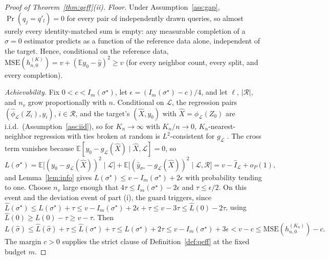 \documentclass{article}
\theoremstyle{definition}
\theoremstyle{plain}
\begin{document}
\begin{proof}[Proof of Theorem~\ref{thm:qeff}(ii)]
\emph{Floor.} Under Assumption~\ref{ass:gap}, $\Pr(q_j=q'_l)=0$ for every pair of
independently drawn queries, so almost surely every identity-matched sum is
empty: any measurable completion of a $\sigma=0$ estimator predicts as a function
of the reference data alone, independent of the target. Hence, conditional on the
reference data,
$\mathrm{MSE}(h_{n,0}^{(K)})=v+(\mathbb{E}y_{0}-\hat y)^2\ge v$
(for every neighbor count, every split, and every completion).

\emph{Achievability.} Fix $0<c<I_m(\sigma^\star)$, let
$\epsilon=(I_m(\sigma^\star)-c)/4$, and let $\ell$, $|\mathcal{R}|$, and $n_v$ grow
proportionally with $n$. Conditional on $\mathcal{L}$, the regression pairs
$(\hat\phi_{\mathcal{L}}(Z_i),y_i)$, $i\in\mathcal{R}$, and the target's $(\hat X,y_0)$ with
$\hat X=\hat\phi_{\mathcal{L}}(Z_0)$ are i.i.d.\ (Assumption~\ref{ass:iid}), so for
$K_n\to\infty$ with $K_n/n\to0$, $K_n$-nearest-neighbor regression with ties broken
at random is $L^2$-consistent for $g_{\mathcal{L}}$ . The cross term
vanishes because $\mathbb{E}[y_0-g_{\mathcal{L}}(\hat X)\mid\hat X,\mathcal{L}]=0$, so
\[
L(\sigma^\star)=\mathbb{E}\big[(y_0-g_{\mathcal{L}}(\hat X))^2\mid \mathcal{L}\big]
+\mathbb{E}\big[(\hat y_{\sigma^\star}-g_{\mathcal{L}}(\hat X))^2\mid \mathcal{L},\mathcal{R}\big]
=v-\hat I_{\mathcal{L}}+o_P(1),
\]
and Lemma~\ref{lem:info} gives $L(\sigma^\star)\le v-I_m(\sigma^\star)+2\epsilon$
with probability tending to one. Choose $n_v$ large enough that
$4\tau\le I_m(\sigma^\star)-2\epsilon$ and $\tau\le\epsilon/2$. On this event and
the deviation event of part (i), the guard triggers, since
$\hat L(\sigma^\star)\le L(\sigma^\star)+\tau\le v-I_m(\sigma^\star)+2\epsilon+\tau
\le v-3\tau\le\hat L(0)-2\tau$, using $\hat L(0)\ge L(0)-\tau\ge v-\tau$. Then
\[
L(\hat\sigma)\le\hat L(\hat\sigma)+\tau\le\hat L(\sigma^\star)+\tau
\le L(\sigma^\star)+2\tau\le v-I_m(\sigma^\star)+3\epsilon<v-c
\le\mathrm{MSE}(h_{n,0}^{(K_n)})-c .
\]
The margin $c>0$ supplies the strict clause of Definition~\ref{def:qeff} at the
fixed budget $m$.
\end{proof}

\end{document}
